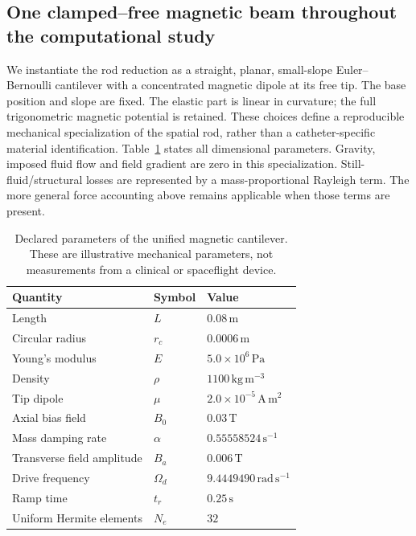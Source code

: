 \subsection{One clamped--free magnetic beam throughout the computational study}
\label{sec:unified-model}
We instantiate the rod reduction as a straight, planar, small-slope
Euler--Bernoulli cantilever with a concentrated magnetic dipole at its free
tip. The base position and slope are fixed. The elastic part is linear in
curvature; the full trigonometric magnetic potential is retained. These
choices define a reproducible mechanical specialization of the spatial
rod, rather than a catheter-specific material identification. Table~\ref{tab:unified-si}
states all dimensional parameters. Gravity, imposed fluid flow and field
gradient are zero in this specialization. Still-fluid/structural losses
are represented by a mass-proportional Rayleigh term. The more general
force accounting above remains applicable when those terms are present.

\begin{table}[t]
\centering
\caption{Declared parameters of the unified magnetic cantilever. These are
illustrative mechanical parameters, not measurements from a clinical or
spaceflight device.}
\label{tab:unified-si}
\setlength{\tabcolsep}{3pt}
\begin{tabular}{lll}
\toprule
Quantity & Symbol & Value\\
\midrule
Length & $L$ & $0.08\,\mathrm m$\\
Circular radius & $r_c$ & $0.0006\,\mathrm m$\\
Young's modulus & $E$ & $5.0\times10^6\,\mathrm{Pa}$\\
Density & $\rho$ & $1100\,\mathrm{kg\,m^{-3}}$\\
Tip dipole & $\mu$ & $2.0\times10^{-5}\,\mathrm{A\,m^2}$\\
Axial bias field & $B_0$ & $0.03\,\mathrm T$\\
Mass damping rate & $\alpha$ & $0.55558524\,\mathrm{s^{-1}}$\\
Transverse field amplitude & $B_a$ & $0.006\,\mathrm T$\\
Drive frequency & $\Omega_d$ & $9.4449490\,\mathrm{rad\,s^{-1}}$\\
Ramp time & $t_r$ & $0.25\,\mathrm s$\\
Uniform Hermite elements & $N_e$ & $32$\\
\bottomrule
\end{tabular}
\end{table}

